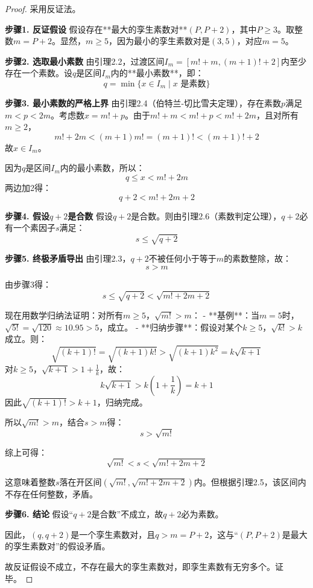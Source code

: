 \documentclass[12pt,a4paper,reqno]{amsart}
\theoremstyle{plain}
\theoremstyle{definition}
\theoremstyle{remark}
\begin{document}
	\begin{proof}
		采用反证法。
		
		\medskip
		\noindent\textbf{步骤1. 反证假设}
		假设存在**最大的孪生素数对**$(P, P+2)$，其中$P \ge 3$。取整数$m = P+2$。显然，$m \ge 5$，因为最小的孪生素数对是$(3,5)$，对应$m=5$。
		
		\medskip
		\noindent\textbf{步骤2. 选取最小素数}
		由引理2.2，过渡区间$I_m = [m!+m, (m+1)!+2]$内至少存在一个素数。设$q$是区间$I_m$内的**最小素数**，即：
		\[
		q = \min \{ x \in I_m \mid x \text{ 是素数} \}
		\]
		
		\medskip
		\noindent\textbf{步骤3. 最小素数的严格上界}
		由引理2.4（伯特兰-切比雪夫定理），存在素数$p$满足$m < p < 2m$。考虑数$x = m!+p$。由于$m!+m < m!+p < m!+2m$，且对所有$m \ge 2$，
		\[
		m!+2m < (m+1)m! = (m+1)! < (m+1)!+2
		\]
		故$x \in I_m$。
		
		因为$q$是区间$I_m$内的最小素数，所以：
		\[
		q \le x < m!+2m
		\]
		两边加2得：
		\[
		q+2 < m!+2m+2
		\]
		
		\medskip
		\noindent\textbf{步骤4. 假设$q+2$是合数}
		假设$q+2$是合数。则由引理2.6（素数判定公理），$q+2$必有一个素因子$s$满足：
		\[
		s \le \sqrt{q+2}
		\]
		
		\medskip
		\noindent\textbf{步骤5. 终极矛盾导出}
		由引理2.3，$q+2$不被任何小于等于$m$的素数整除，故：
		\[
		s > m
		\]
		
		由步骤3得：
		\[
		s \le \sqrt{q+2} < \sqrt{m!+2m+2}
		\]
		
		现在用数学归纳法证明：对所有$m \ge 5$，$\sqrt{m!} > m$：
		- **基例**：当$m=5$时，$\sqrt{5!} = \sqrt{120} \approx 10.95 > 5$，成立。
		- **归纳步骤**：假设对某个$k \ge 5$，$\sqrt{k!} > k$成立。则：
		\[
		\sqrt{(k+1)!} = \sqrt{(k+1)k!} > \sqrt{(k+1)k^2} = k\sqrt{k+1}
		\]
		对$k \ge 5$，$\sqrt{k+1} > 1 + \frac{1}{k}$，故：
		\[
		k\sqrt{k+1} > k\left(1 + \frac{1}{k}\right) = k+1
		\]
		因此$\sqrt{(k+1)!} > k+1$，归纳完成。
		
		所以$\sqrt{m!} > m$，结合$s > m$得：
		\[
		s > \sqrt{m!}
		\]
		
		综上可得：
		\[
		\sqrt{m!} < s < \sqrt{m!+2m+2}
		\]
		
		这意味着整数$s$落在开区间$(\sqrt{m!}, \sqrt{m!+2m+2})$内。但根据引理2.5，该区间内不存在任何整数，矛盾。
		
		\medskip
		\noindent\textbf{步骤6. 结论}
		假设“$q+2$是合数”不成立，故$q+2$必为素数。
		
		因此，$(q, q+2)$是一个孪生素数对，且$q > m = P+2$，这与“$(P, P+2)$是最大的孪生素数对”的假设矛盾。
		
		故反证假设不成立，不存在最大的孪生素数对，即孪生素数有无穷多个。证毕。
	\end{proof}
	
\end{document}
